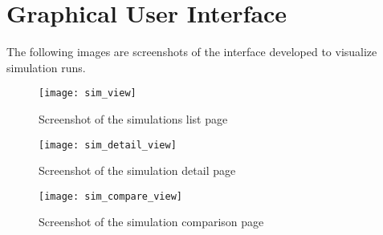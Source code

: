\chapter{Graphical User Interface} \label{ap1:interface} %

The following images are screenshots of the interface developed to visualize 
simulation runs.

\begin{figure}
    \begin{center}
        \leavevmode
        \texttt{[image: sim\_view]}
        \caption{Screenshot of the simulations list page}
        \label{fig:sim_view}
    \end{center}
\end{figure}

\begin{figure}[p]
    \begin{center}
        \leavevmode
        \texttt{[image: sim\_detail\_view]}
        \caption{Screenshot of the simulation detail page}
        \label{fig:sim_detail_view}
    \end{center}
\end{figure}

\begin{figure}[p]
    \begin{center}
        \leavevmode
        \texttt{[image: sim\_compare\_view]}
        \caption{Screenshot of the simulation comparison page}
        \label{fig:sim_compare_view}
    \end{center}
\end{figure}

